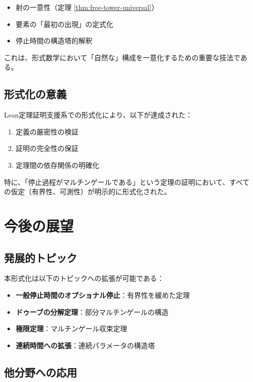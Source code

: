 \documentclass[a4paper,12pt]{article}
\theoremstyle{definition}
\begin{document}
\begin{itemize}
\item 射の一意性（定理 \ref{thm:free-tower-universal}）
\item 要素の「最初の出現」の定式化
\item 停止時間の構造塔的解釈
\end{itemize}

これは、形式数学において「自然な」構成を一意化するための重要な技法である。

\subsection{形式化の意義}

Lean定理証明支援系での形式化により、以下が達成された：

\begin{enumerate}
\item 定義の厳密性の検証
\item 証明の完全性の保証
\item 定理間の依存関係の明確化
\end{enumerate}

特に、「停止過程がマルチンゲールである」という定理の証明において、すべての仮定（有界性、可測性）が明示的に形式化された。

\section{今後の展望}

\subsection{発展的トピック}

本形式化は以下のトピックへの拡張が可能である：

\begin{itemize}
\item \textbf{一般停止時間のオプショナル停止}：有界性を緩めた定理
\item \textbf{ドゥーブの分解定理}：部分マルチンゲールの構造
\item \textbf{極限定理}：マルチンゲール収束定理
\item \textbf{連続時間への拡張}：連続パラメータの構造塔
\end{itemize}

\subsection{他分野への応用}
\end{document}

